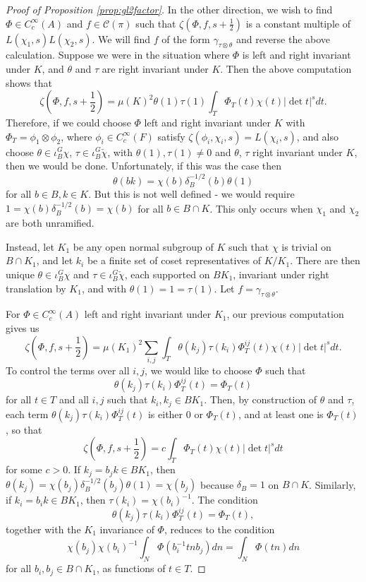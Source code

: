 \begin{proof}[Proof of Proposition \ref{prop:gl2factor}]
    In the other direction, we wish to find $\Phi \in C_c^\infty(A)$ and $f \in \mathcal C(\pi)$ such that $\zeta(\Phi,f,s+\frac{1}{2})$ is a constant multiple of $L(\chi_1,s)L(\chi_2,s)$. We will find $f$ of the form $\gamma_{\tau \otimes \theta}$ and reverse the above calculation. Suppose we were in the situation where $\Phi$ is left and right invariant under $K$, and $\theta$ and $\tau$ are right invariant under $K$. Then the above computation shows that 
    $$\zeta(\Phi,f,s+\frac{1}{2}) = \mu(K)^2 \theta(1)\tau(1) \int_T \Phi_T(t)\chi(t)|\det t|^s dt.$$
    Therefore, if we could choose $\Phi$ left and right invariant under $K$ with $\Phi_T = \phi_1\otimes \phi_2$, where $\phi_i \in C_c^\infty(F)$ satisfy $\zeta(\phi_i,\chi_i,s)=L(\chi_i,s)$, and also choose $\theta \in \iota_B^G \chi$, $\tau \in \iota_B^G \check{\chi}$, with $\theta(1), \tau(1) \neq 0$ and $\theta$, $\tau$ right invariant under $K$, then we would be done. Unfortunately, if this was the case then $$\theta(bk) = \chi(b) \delta_B^{-1/2}(b) \theta(1)$$ for all $b \in B, k \in K$. But this is not well defined - we would require $1=\chi(b)\delta_B^{-1/2}(b) = \chi(b)$ for all $b \in B \cap K$. This only occurs when $\chi_1$ and $\chi_2$ are both unramified.

    Instead, let $K_1$ be any open normal subgroup of $K$ such that $\chi$ is trivial on $B \cap K_1$, and let $k_i$ be a finite set of coset representatives of $K/K_1$. There are then unique $\theta \in \iota_B^G \chi$ and $\tau \in \iota_B^G \check{\chi}$, each supported on $BK_1$, invariant under right translation by $K_1$, and with $\theta(1)=1=\tau(1)$. Let $f=\gamma_{\tau \otimes \theta}$.
    
    For $\Phi \in C_c^\infty(A)$ left and right invariant under $K_1$, our previous computation gives us
    $$\zeta(\Phi,f,s+\frac{1}{2}) = \mu(K_1)^2 \sum\limits_{i,j}  \int_T \theta(k_j)\tau(k_i)\Phi_T^{ij}(t)\chi(t)|\det t|^s dt.
    $$
    To control the terms over all $i,j$, we would like to choose $\Phi$ such that 
    $$\theta(k_j)\tau(k_i)\Phi_T^{ij}(t) = \Phi_T(t)$$
    for all $t \in T$ and all $i,j$ such that $k_i,k_j \in BK_1$. Then, by construction of $\theta$ and $\tau$, each term $\theta(k_j)\tau(k_i)\Phi_T^{ij}(t)$ is either 0 or $\Phi_T(t)$, and at least one is $\Phi_T(t)$, so that
    $$\zeta(\Phi,f,s+\frac{1}{2}) = c \int_T \Phi_T(t) \chi(t) |\det t|^s dt$$ for some $c>0$. If $k_j = b_jk \in BK_1$, then $\theta(k_j) = \chi(b_j)\delta_B^{-1/2}(b_j)\theta(1) = \chi(b_j)$ because $\delta_B=1$ on $B \cap K$. Similarly, if $k_i=b_ik \in BK_1$, then $\tau(k_i)=\chi(b_i)^{-1}$. The condition $$\theta(k_j)\tau(k_i)\Phi_T^{ij}(t) = \Phi_T(t),$$ together with the $K_1$ invariance of $\Phi$, reduces to the condition
    $$\chi(b_j)\chi(b_i)^{-1} \int_N \Phi(b_i^{-1}tnb_j) dn = \int_N \Phi(tn)dn$$ for all $b_i,b_j \in B \cap K_1$, as functions of $t \in T$.


\end{proof}
